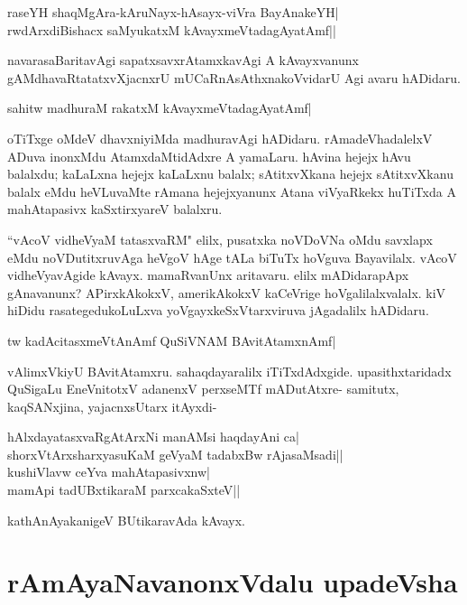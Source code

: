 \begin{shloka} 
raseYH shaqMgAra-kAruNayx-hAsayx-viVra BayAnakeYH|\label{188b}\\ 
rwdArxdiBishacx saMyukatxM kAvayxmeVtadagAyatAmf||
\end{shloka}

navarasaBaritavAgi sapatxsavxrAtamxkavAgi A kAvayxvanunx gAMdhavaRtatatxvXjacnxrU mUCaRnAsAthxnakoVvidarU Agi avaru hADidaru. 


\begin{shloka} 
sahitw madhuraM rakatxM kAvayxmeVtadagAyatAmf|\label{189b}
\end{shloka}

oTiTxge oMdeV dhavxniyiMda madhuravAgi hADidaru. rAmadeVhadalelxV ADuva inonxMdu AtamxdaMtidAdxre A yamaLaru. hAvina hejejx hAvu balalxdu; kaLaLxna hejejx kaLaLxnu balalx; sAtitxvXkana hejejx sAtitxvXkanu balalx eMdu heVLuvaMte rAmana hejejxyanunx Atana viVyaRkekx huTiTxda A mahAtapasivx kaSxtirxyareV balalxru. 

``vAcoV vidheVyaM tatasxvaRM"\label{189a} elilx, pusatxka noVDoVNa oMdu savxlapx eMdu noVDutitxruvAga heVgoV hAge tALa biTuTx hoVguva Bayavilalx. vAcoV vidheVyavAgide kAvayx. mamaRvanUnx aritavaru. elilx mADidarapApx gAnavanunx? APirxkAkokxV, amerikAkokxV kaCeVrige hoVgalilalxvalalx. kiV hiDidu rasategedukoLuLxva yoVgayxkeSxVtarxviruva jAgadalilx hADidaru. 

\begin{shloka} 
tw kadAcitasxmeVtAnAmf QuSiVNAM BAvitAtamxnAmf| \label{189}
\end{shloka}

vAlimxVkiyU BAvitAtamxru. sahaqdayaralilx iTiTxdAdxgide. upasithxtaridadx QuSigaLu EneVnitotxV adanenxV perxseMTf mADutAtxre- samitutx, kaqSANxjina, yajacnxsUtarx itAyxdi- 

\begin{shloka}
hAlxdayatasxvaRgAtArxNi manAMsi haqdayAni ca|\label{189c}\\ 
shorxVtArxsharxyasuKaM geVyaM tadabxBw rAjasaMsadi||\\ 
kushiVlavw ceYva mahAtapasivxnw|\\ 
mamApi tadUBxtikaraM parxcakaSxteV||
\end{shloka}

kathAnAyakanigeV BUtikaravAda kAvayx. 

\section*{rAmAyaNavanonxVdalu upadeVsha}


